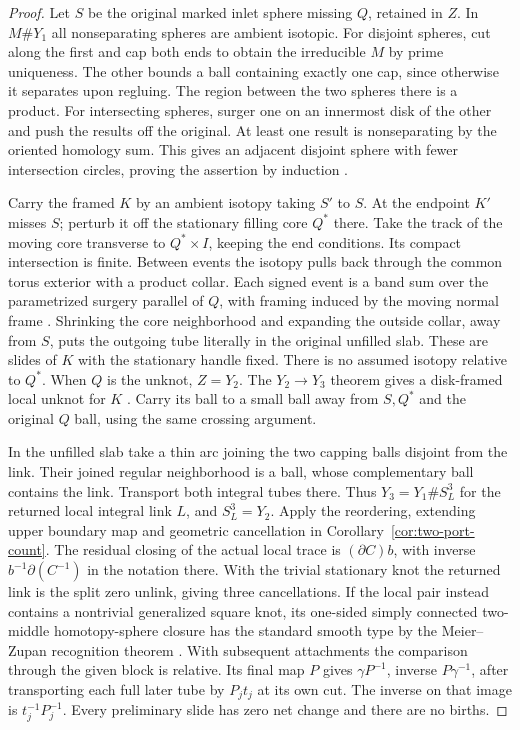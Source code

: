 \documentclass[11pt,letterpaper]{article}
\numberwithin{equation}{section}
\theoremstyle{remark}
\begin{document}
\begin{proof}
Let \(S\) be the original marked inlet sphere missing \(Q\), retained
in \(Z\). In \(M\#Y_1\) all nonseparating spheres are ambient isotopic.
For disjoint spheres, cut along the first and cap both ends to obtain
the irreducible \(M\) by prime uniqueness. The other bounds a ball
containing exactly one cap, since otherwise it separates upon regluing.
The region between the two spheres there is a product. For intersecting
spheres, surger one on an innermost disk of the other and push the
results off the original. At least one result is nonseparating by
the oriented homology sum. This gives an adjacent disjoint sphere
with fewer intersection circles, proving the assertion by induction
\cite[Proposition 4]{Trace1982ThreeHandles}.

Carry the framed \(K\) by an ambient isotopy taking \(S'\) to \(S\).
At the endpoint \(K'\) misses \(S\); perturb it off the stationary
filling core \(Q^*\) there. Take the track of the moving core transverse
to \(Q^*\times I\), keeping the end conditions. Its compact intersection
is finite. Between events the isotopy pulls back through the common
torus exterior with a product collar. Each signed event is a band sum
over the parametrized surgery parallel of \(Q\), with framing induced
by the moving normal frame
\cite[proof of Proposition 3.2]{GompfScharlemannThompson2010}.
Shrinking the core neighborhood and expanding the outside collar,
away from \(S\), puts the outgoing tube literally in the original
unfilled slab. These are slides of \(K\) with the stationary handle
fixed. There is no assumed isotopy relative to \(Q^*\).
When \(Q\) is the unknot, \(Z=Y_2\). The \(Y_2\to Y_3\) theorem gives
a disk-framed local unknot for \(K\)
\cite[Theorem 5.1]{MeierSchirmerZupan2016Trisections}.
Carry its ball to a small ball away from \(S,Q^*\) and the original
\(Q\) ball, using the same crossing argument.

In the unfilled slab take a thin arc joining the two capping balls
disjoint from the link. Their joined regular neighborhood is a ball,
whose complementary ball contains the link. Transport both integral
tubes there. Thus \(Y_3=Y_1\#S^3_L\) for the returned local
integral link \(L\), and \(S^3_L=Y_2\).
Apply the reordering, extending upper boundary map and geometric
cancellation in Corollary~\ref{cor:two-port-count}. The residual closing
of the actual local trace is \((\partial C)b\), with inverse
\(b^{-1}\partial(C^{-1})\) in the notation there. With the trivial
stationary knot the returned link is the split zero unlink, giving
three cancellations. If the local pair instead contains a nontrivial
generalized square knot, its one-sided simply connected two-middle
homotopy-sphere closure has the standard smooth type by the
Meier--Zupan recognition theorem \cite[Theorem 1.1]{MeierZupan2022SquareKnots}. With subsequent attachments the comparison through
the given block is relative. Its final map \(P\) gives
\(\gamma P^{-1}\), inverse \(P\gamma^{-1}\), after transporting each
full later tube by \(P_jt_j\) at its own cut. The inverse on that image
is \(t_j^{-1}P_j^{-1}\). Every preliminary slide has zero net change
and there are no births.
\end{proof}
\end{document}
